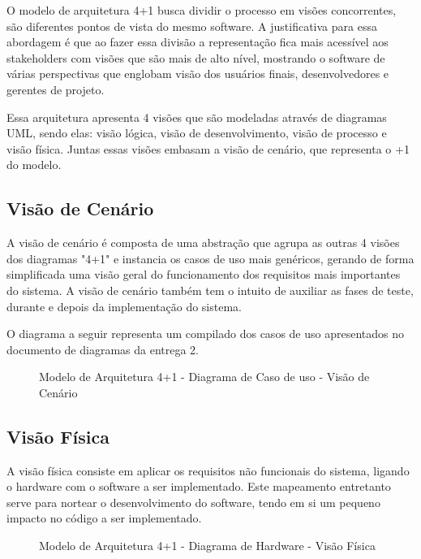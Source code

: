 \documentclass[12pt]{article}
\begin{document}
O modelo de arquitetura 4+1 busca dividir o processo em visões concorrentes, são diferentes pontos de vista do mesmo software. A justificativa para essa abordagem é que ao fazer essa divisão a representação fica mais acessível aos stakeholders com visões que são mais de alto nível, mostrando o software de várias perspectivas que englobam visão dos usuários finais, desenvolvedores e gerentes de projeto.\cite{kruchten19954+}

Essa arquitetura apresenta 4 visões que são modeladas através de diagramas UML, sendo elas: visão lógica, visão de desenvolvimento, visão de processo e visão física. Juntas essas visões embasam a visão de cenário, que representa o +1 do modelo.

\subsection{Visão de Cenário}

A visão de cenário é composta de uma abstração que agrupa as outras 4 visões dos diagramas "4+1" e instancia os casos de uso mais genéricos, gerando de forma simplificada uma visão geral do funcionamento dos requisitos mais importantes do sistema. A visão de cenário também tem o intuito de  auxiliar as fases de teste, durante e depois da implementação do sistema.

O diagrama a seguir representa um compilado dos casos de uso apresentados no documento de diagramas da entrega 2.

\begin{figure}[!h]
    \caption{\label{fig:casoUso} Modelo de Arquitetura 4+1 - Diagrama de Caso de uso - Visão de Cenário}
\end{figure}

\vfill%
\pagebreak%

\subsection{Visão Física}

A visão física consiste em aplicar os requisitos não funcionais do sistema, ligando o hardware com o software a ser implementado. Este mapeamento entretanto serve para nortear o desenvolvimento do software, tendo em si um pequeno impacto no código a ser implementado.


\begin{figure}[!h]
    \caption{\label{fig:visaoFisica} Modelo de Arquitetura 4+1 - Diagrama de Hardware - Visão Física}
\end{figure}
\end{document}
